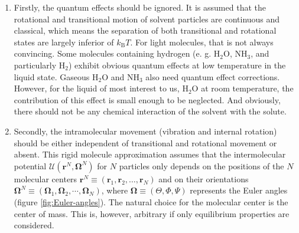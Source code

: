 \begin{enumerate}
\item Firstly, the quantum effects should be ignored. It is assumed that
the rotational and transitional motion of solvent particles are continuous
and classical, which means the separation of both transitional and
rotational states are largely inferior of $k_{\mathrm{B}}T$. For
light molecules, that is not always convincing. Some molecules containing
hydrogen (e. g. $\mathrm{H_{2}O}$, $\mathrm{NH_{3}}$, and particularly
$\mathrm{H_{2}}$) exhibit obvious quantum effects at low temperature
in the liquid state. Gaseous $\mathrm{H_{2}O}$ and $\mathrm{NH_{3}}$
also need quantum effect corrections. However, for the liquid of most
interest to us, $\mathrm{H_{2}O}$ at room temperature, the contribution
of this effect is small enough to be neglected. And obviously, there
should not be any chemical interaction of the solvent with the solute.
\item Secondly, the intramolecular movement (vibration and internal rotation) should
be either independent of transitional and rotational movement or absent.
This rigid molecule approximation assumes that the intermolecular
potential $\mathcal{U}(\mathbf{r}^{N},\mathbf{\Omega}^{N})$ for $N$
particles only depends on the positions of the $N$ molecular centers
$\mathbf{r}^{N}\equiv(\mathbf{r}_{1},\mathbf{r}_{2},\ldots,\mathbf{r}_{N})$
and on their orientations $\mathbf{\Omega}^{N}\equiv(\mathbf{\Omega}_{1},\mathbf{\Omega}_{2},\cdots,\mathbf{\Omega}_{N})$,
where $\mathbf{\Omega}\equiv(\Theta,\Phi,\Psi)$ represents the Euler
angles (figure \ref{fig:Euler-angles}). The natural choice for the
molecular center is the center of mass. This is, however, arbitrary
if only equilibrium properties are considered.


\end{enumerate}
